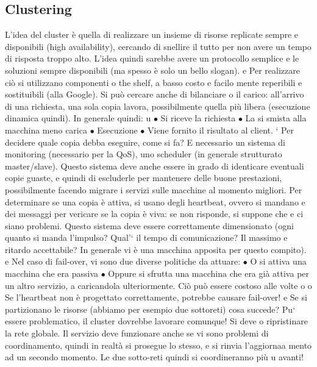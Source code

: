 \documentclass[a4paper,12pt]{article}
\begin{document}
\subsection{Clustering}
L'idea del cluster è quella di realizzare un insieme di risorse replicate sempre
e
disponibili (high availability), cercando di snellire il tutto per non avere un tempo di risposta troppo alto. L'idea
quindi sarebbe avere un protocollo semplice
e le soluzioni sempre disponibili (ma spesso è solo un bello slogan).
e
Per realizzare ciò si utilizzano componenti o the shelf, a basso costo e facilo
mente reperibili e sostituibili (alla Google). Si può cercare anche di bilanciare
o
il carico: all'arrivo di una richiesta, una sola copia lavora, possibilmente quella
più libera (esecuzione dinamica quindi). In generale quindi:
u
$\bullet$ Si riceve la richiesta
$\bullet$ La si smista alla macchina meno carica
$\bullet$ Esecuzione
$\bullet$ Viene fornito il risultato al client.
`
Per decidere quale copia debba eseguire, come si fa? E necessario un sistema
di monitoring (necessario per la QoS), uno scheduler (in generale strutturato
master/slave). Questo sistema deve anche essere in grado di identicare eventuali copie guaste, e quindi di escluderle
per mantenere delle buone prestazioni,
possibilmente facendo migrare i servizi sulle macchine al momento migliori. Per
determinare se una copia è attiva, si usano degli heartbeat, ovvero si mandano
e
dei messaggi per vericare se la copia è viva: se non risponde, si suppone che
e
ci siano problemi. Questo sistema deve essere correttamente dimensionato (ogni quanto si manda l'impulso? Qual'` il
tempo di comunicazione? Il massimo
e
ritardo accettabile? In generale vi è una macchina apposita per questo compito).
e
Nel caso di fail-over, vi sono due diverse politiche da attuare:
$\bullet$ O si attiva una macchina che era passiva
$\bullet$ Oppure si sfrutta una macchina che era già attiva per un altro servizio,
a
caricandola ulteriormente. Ciò può essere costoso alle volte
o o
Se l'heartbeat non è progettato correttamente, potrebbe causare fail-over!
e
Se si partizionano le risorse (abbiamo per esempio due sottoreti) cosa succede? Pu` essere problematico, il cluster
dovrebbe lavorare comunque! Si deve
o
ripristinare la rete globale. Il servizio deve funzionare anche se vi sono problemi
di coordinamento, quindi in realtà si prosegue lo stesso, e si rinvia l'aggiornaa
mento ad un secondo momento. Le due sotto-reti quindi si coordineranno più
u
avanti!
\end{document}
